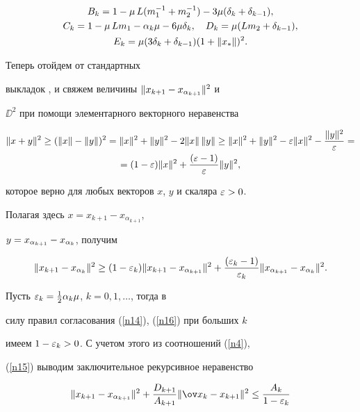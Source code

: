 \begin{pf}
\begin{gather*}
B_k=1-\mu\,L(m_1^{-1}+m_2^{-1})-3\mu(\dk+\dkk),\\


C_k=1-\mu\,Lm_1-\alpha_k\mu-6\mu\dk,\quad


D_k=\mu(Lm_2+\dkk),\\


E_k=\mu(3\dk+\dkk)\K^2.


\end{gather*}


Теперь отойдем от стандартных


выкладок \cite{ant1}, \cite{ppf1} и свяжем величины $\|x_{k+1}-x_{\alpha_{k+1}}\|^2$ и


$\DD^2$ при помощи элементарного векторного неравенства


\begin{gather*}


\|x+y\|^2\geq(\|x\|-\|y\|)^2=\|x\|^2+\|y\|^2


-2\|x\|\,\|y\|


 \geq \|x\|^2+\|y\|^2-\eps\|x\|^2


-\frac{\|y\|^2}{\eps}=\\


=(1-\eps)\|x\|^2+\frac{(\eps-1)}{\eps}\|y\|^2,


\end{gather*}


которое верно для любых векторов $x$, $y$ и скаляра $\varepsilon>0$.


Полагая здесь $x=x_{k+1}-x_{\alpha_{k+1}}$,


$y=x_{\alpha_{k+1}}-x_{\alpha_k}$, получим


$$


\DD^2\geq (1-\eps_k)\DDD^2 +


\frac{(\eps_k-1)}{\eps_k}\|x_{\alpha_{k+1}}


-\xak\|^2.


$$


Пусть $\varepsilon_k=\frac{ 1}{ 2}\alpha_k\mu$, $k=0,1,\dotsc$, тогда в


силу правил согласования (\ref{n14}), (\ref{n16}) при больших $k$


имеем $1-\varepsilon_k>0$. С учетом этого из соотношений (\ref{n4}),


(\ref{n15}) выводим заключительное рекурсивное неравенство


\begin{multline}\label{n17}


\DDD^2+\frac{ D_{k+1}}{ A_{k+1}}\Ax^2\leq


\frac{ A_k}{ 1-\eps_k}



\end{multline}
\end{pf}
